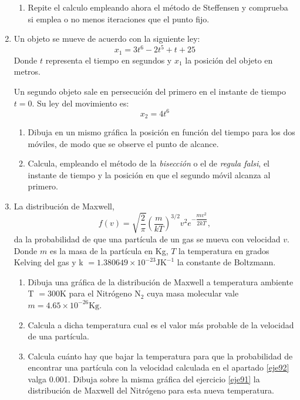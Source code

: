 \begin{paracol}{2}
\begin{enumerate}
\begin{enumerate}
\item Repite el calculo empleando ahora el método de Steffensen y comprueba si emplea o no menos iteraciones que el punto fijo.
\end{enumerate}

\item Un objeto se mueve de acuerdo con la siguiente ley:
\begin{equation}
x_1 = 3t^6 - 2t^5 + t + 25
\end{equation}
Donde  $t$ representa el tiempo en segundos y $x_1$ la posición del objeto en metros.

 Un segundo objeto sale en persecución del primero en el instante de tiempo $t=0$. Su ley del movimiento es:
\begin{equation}
x_2 = 4t^6
\end{equation}
\begin{enumerate}
\item Dibuja en un mismo gráfica la posición en función del tiempo para los dos móviles, de modo que se observe el punto de alcance.  
\item Calcula, empleando el método de la \emph{bisección} o el de \emph{regula falsi},  el instante de tiempo y la posición en que el segundo móvil alcanza al primero.
\end{enumerate}

\item La distribución de Maxwell, 
\begin{equation}
f(v) = \sqrt{\frac{2}{\pi}}\left( \frac{m}{kT}\right)^{3/2}v^2e^{-\dfrac{\scriptstyle mv^2}{\scriptstyle 2kT}},
\end{equation}
da la probabilidad de que una partícula de un gas se mueva con velocidad $v$. Donde $m$ es la masa de la partícula en Kg, $T$ la temperatura en grados Kelving del gas y k $=1.380649\times 10^{-23} \text{JK}^{-1}$ la constante de Boltzmann. 
\begin{enumerate}
\item  \label{eje91}Dibuja una gráfica de la distribución de Maxwell a temperatura ambiente T $= 300$K para el Nitrógeno N$_2$  cuya masa molecular vale $m = 4.65 \times 10^{-26}	\text{Kg}$.
\item \label{eje92}Calcula a dicha temperatura cual es el valor más probable de la velocidad de una partícula.
\item Calcula cuánto hay que bajar la temperatura para que la probabilidad de encontrar una partícula con la velocidad calculada en el apartado \ref{eje92} valga 0.001. Dibuja sobre la misma gráfica del ejercicio \ref{eje91} la distribución de Maxwell del Nitrógeno para esta nueva temperatura. 


\end{enumerate}
\end{enumerate}
\end{paracol}
